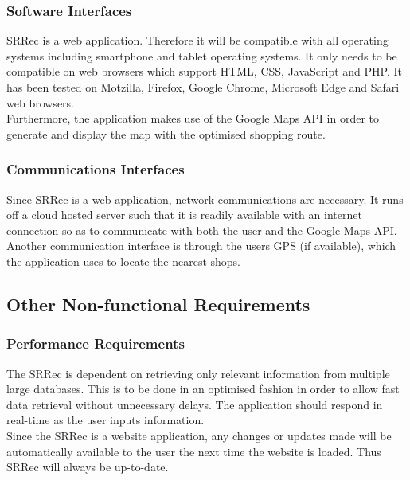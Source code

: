 \documentclass[10pt,twocolumn]{witseiepaper}
\begin{document}
		\subsubsection{Software Interfaces}
		
		SRRec is a web application. Therefore it will be compatible with all operating systems including smartphone and tablet operating systems. It only needs to be compatible on web browsers which support HTML, CSS, JavaScript and PHP. It has been tested on Motzilla, Firefox, Google Chrome, Microsoft Edge and Safari web browsers. \\
		
		Furthermore, the application makes use of the Google Maps API in order to generate and display the map with the optimised shopping route. 
		
		\subsubsection{Communications Interfaces}
		
		Since SRRec is a web application, network communications are necessary. It runs off a cloud hosted server such that it is readily available with an internet connection so as to communicate with both the user and the Google Maps API. Another communication interface is through the users GPS (if available), which the application uses to locate the nearest shops.
		
		\subsection{Other Non-functional Requirements}
		
		\subsubsection{Performance Requirements}
		
		The SRRec is dependent on retrieving only relevant information from multiple large databases. This is to be done in an optimised fashion in order to allow fast data retrieval without unnecessary delays. The application should respond in real-time as the user inputs information.\\
		
		Since the SRRec is a website application, any changes or updates made will be automatically available to the user the next time the website is loaded. Thus SRRec will always be up-to-date.\\
		
\end{document}
